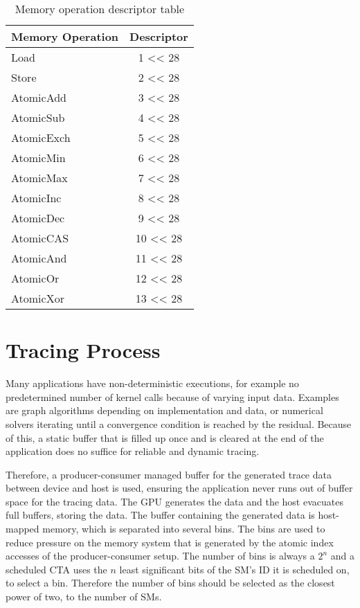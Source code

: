 \begin{table}[t]
	\centering
	\begin{tabular}{|l|c|}
		\hline 
		Memory Operation & Descriptor \\ 
		\hline 
		\hline
		Load & 1 << 28 \\ 
		Store & 2 << 28 \\ 
		AtomicAdd & 3 << 28 \\ 
		AtomicSub & 4 << 28 \\ 
		AtomicExch & 5 << 28 \\ 
		AtomicMin & 6 << 28 \\ 
		AtomicMax & 7 << 28 \\ 
		AtomicInc & 8 << 28 \\ 
		AtomicDec & 9 << 28 \\ 
		AtomicCAS & 10 << 28 \\ 
		AtomicAnd & 11 << 28 \\ 
		AtomicOr & 12 << 28 \\ 
		AtomicXor & 13 << 28 \\ 
		\hline 
	\end{tabular} 
	\label{TypeTab}
	\caption{Memory operation descriptor table}
\end{table}

\section{Tracing Process}\label{sec:prodcons}
	Many applications have non-deterministic executions, for example no predetermined number of kernel calls because of varying input data. Examples are graph algorithms depending on implementation and data, or numerical solvers iterating until a
	convergence condition is reached by the residual. Because of this, a static buffer that is filled up once and is cleared at the end of the application does no suffice for reliable and dynamic tracing.
	
	Therefore, a producer-consumer managed buffer for the generated trace data between device and host is used, ensuring the application never runs out of buffer space for the tracing data. The GPU generates the data and the host evacuates full buffers, storing the data.
	The buffer containing the generated data is host-mapped memory, which is separated into several bins. The bins are used to reduce
	pressure on the memory system that is generated by the atomic index accesses of the producer-consumer setup. The number of bins 
	is always a $2^n$ and a scheduled CTA uses the  $n$ least significant bits of the SM's ID it is scheduled on, to select a bin. Therefore the number of bins should be selected as the closest power of two, to the number of SMs.

